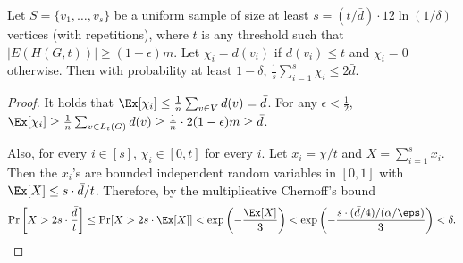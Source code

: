 \begin{claim}\label{clm:average}
Let $S=\{v_1, \ldots, v_s\}$ be a uniform sample of size at least $s=(t/\bar{d})\cdot 12\ln(1/\delta)$ vertices (with repetitions), where $t$ is any threshold such that $|E(H(G, t))| \geq (1- \epsilon) m$.
Let $\chi_i=d(v_i)$ if $d(v_i)\leq t$ and $\chi_i=0$ otherwise.
Then with probability at least $1-\delta$, $\frac{1}{s}\sum_{i=1}^s\chi_i\leq 2\bar{d}$.
\end{claim}

\begin{proof}
It holds that $\Ex[\chi_i] \leq \frac{1}{n} \sum_{v \in V} d(v) = \bar{d}$.
For any $\epsilon < \frac{1}{2}$, 
$\Ex[\chi_i]\geq
\frac{1}{n}\sum_{v \in L_t(G)} d(v) 
\geq \frac{1}{n}\cdot 2(1-\epsilon)m
\geq \bar{d}$.

Also, for every $i\in [s]$, $\chi_i\in [0,t]$ for every $i$. 
Let $x_i=\chi/t$ and $X=\sum_{i=1}^s x_i$.
Then the $x_i$'s are bounded independent   random variables in $[0,1]$ with $\Ex[X]\leq s\cdot \bar{d}/t$. Therefore, by the multiplicative Chernoff's bound
\[
\Pr\left[X > 2s\cdot \frac{\bar{d}}{t}\right] \leq  \Pr[X > 2s\cdot \Ex[X]] < \exp\left( -\frac{\Ex[X]}{3}\right) < \exp\left( -\frac{s\cdot (\bar{d}/4)/(\alpha/\eps)}{3}\right)< \delta.
\]
\end{proof}